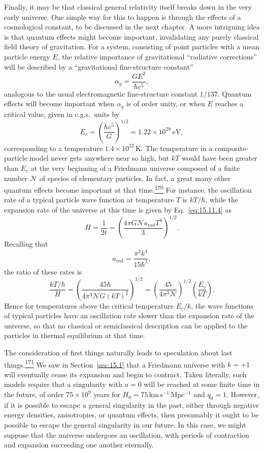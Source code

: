 Finally, it may be that classical general relativity itself breaks down in the
very early universe. One simple way for this to happen is through the effects
of a cosmological constant, to be discussed in the next chapter. A more
intriguing idea is that quantum effects might become important, invalidating
any purely classical field theory of gravitation. For a system, consisting of
point particles with a mean particle energy \(E\), the relative importance of
gravitational ``radiative corrections'' will be described by a ``gravitational
fine-structure constant''
\[
  \alpha_g=\frac{GE^2}{\hbar c^5},
\]
analogous to the usual electromagnetic fine-structure constant \(1/137\).
Quantum effects will become important when \(\alpha_g\) is of order unity,
or when \(E\) reaches a critical value, given in c.g.s.\ units by
\begin{equation}
  E_c
  =
  \left(\frac{\hbar c^5}{G}\right)^{1/2}
  =
  1.22\times10^{28}\,\mathrm{eV},
  \tag{15.11.28}\label{eq:15.11.28}
\end{equation}
corresponding to a temperature \(1.4\times10^{32}\,\mathrm K\). The
temperature in a composite-particle model never gets anywhere near so high,
but \(kT\) would have been greater than \(E_c\) at the very beginning of a
Friedmann universe composed of a finite number \(\mathcal N\) of species of
elementary particles. In fact, a great many other quantum effects become
important at that time.\hyperref[ch15-ref-170]{\textsuperscript{170}} For
instance, the oscillation rate of a typical particle wave function at
temperature \(T\) is \(kT/\hbar\), while the expansion rate of the universe
at this time is given by Eq.~\eqref{eq:15.11.4} as
\[
  H
  =
  \frac1{2t}
  =
  \left(
    \frac{4\pi G\mathcal N a_{\mathrm{rad}}T^4}{3}
  \right)^{1/2}.
\]
Recalling that
\[
  a_{\mathrm{rad}}=\frac{\pi^2k^4}{15\hbar^3},
\]
the ratio of these rates is
\[
  \frac{kT/\hbar}{H}
  =
  \left(
    \frac{45\hbar}{4\pi^3\mathcal N G(kT)^2}
  \right)^{1/2}
  =
  \left(\frac{45}{4\pi^3\mathcal N}\right)^{1/2}
  \left(\frac{E_c}{kT}\right).
\]
Hence for temperatures above the critical temperature \(E_c/k\), the wave
functions of typical particles have an oscillation rate slower than the
expansion rate of the universe, so that no classical or semiclassical
description can be applied to the particles in thermal equilibrium at that
time.

The consideration of first things naturally leads to speculation about last
things.\hyperref[ch15-ref-171]{\textsuperscript{171}} We saw in
Section~\ref{sec:15.1} that a Friedmann universe with \(k=+1\) will
eventually cease its expansion and begin to contract. Taken literally, such
models require that a singularity with \(a=0\) will be reached at some finite
time in the future, of order \(75\times10^9\) years for
\(H_0=75\,\mathrm{km\,s^{-1}\,Mpc^{-1}}\) and \(q_0=1\). However, if it is
possible to escape a general singularity in the past, either through negative
energy densities, anisotropies, or quantum effects, then presumably it ought
to be possible to escape the general singularity in our future. In this case,
we might suppose that the universe undergoes an oscillation, with periods of
contraction and expansion succeeding one another eternally.

